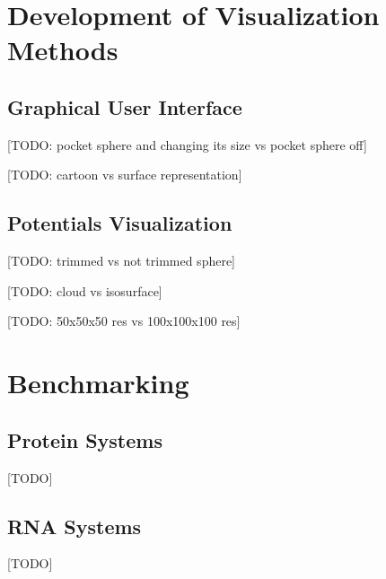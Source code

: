 \section{Development of Visualization Methods}
  \subsection{Graphical User Interface}
    [TODO: pocket sphere and changing its size vs pocket sphere off]

    [TODO: cartoon vs surface representation]


  \subsection{Potentials Visualization}
    [TODO: trimmed vs not trimmed sphere]

    [TODO: cloud vs isosurface]

    [TODO: 50x50x50 res vs 100x100x100 res]


\section{Benchmarking}
  \subsection{Protein Systems}
    [TODO]

  \subsection{RNA Systems}
    [TODO]


